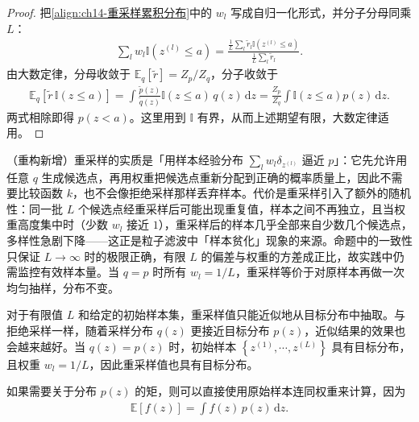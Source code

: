 \documentclass[../../main.tex]{subfiles}
\begin{document}
\begin{proof}
把\eqref{align:ch14-重采样累积分布}中的 $w_{l}$ 写成自归一化形式，并分子分母同乘 $L$：
\begin{align*}
\sum_{l}w_{l}\mathbb{I}\!\left(z^{(l)}\leqslant a\right)=\frac{\frac{1}{L}\sum_{l}\tilde{r}_{l}\mathbb{I}\!\left(z^{(l)}\leqslant a\right)}{\frac{1}{L}\sum_{l}\tilde{r}_{l}}.
\end{align*}
由大数定律，分母收敛于 $\mathbb{E}_{q}\left[\tilde{r}\right]=Z_{p}/Z_{q}$，分子收敛于
\begin{align*}
\mathbb{E}_{q}\left[\tilde{r}\,\mathbb{I}(z\leqslant a)\right]=\int\frac{\widetilde{p}(z)}{\widetilde{q}(z)}\mathbb{I}(z\leqslant a)\,q(z)\,\mathrm{d}z=\frac{Z_{p}}{Z_{q}}\int\mathbb{I}(z\leqslant a)p(z)\,\mathrm{d}z.
\end{align*}
两式相除即得 $p(z<a)$。这里用到 $\mathbb{I}$ 有界，从而上述期望有限，大数定律适用。
\end{proof}

\begin{remark}（重构新增）重采样的实质是「用样本经验分布 $\sum_{l}w_{l}\delta_{z^{(l)}}$ 逼近 $p$」：它先允许用任意 $q$ 生成候选点，再用权重把候选点重新分配到正确的概率质量上，因此不需要比较函数 $k$，也不会像拒绝采样那样丢弃样本。代价是重采样引入了额外的随机性：同一批 $L$ 个候选点经重采样后可能出现重复值，样本之间不再独立，且当权重高度集中时（少数 $w_{l}$ 接近 $1$），重采样后的样本几乎全部来自少数几个候选点，多样性急剧下降——这正是粒子滤波中「样本贫化」现象的来源。命题中的一致性只保证 $L\to\infty$ 时的极限正确，有限 $L$ 的偏差与权重的方差成正比，故实践中仍需监控有效样本量。当 $q=p$ 时所有 $w_{l}=1/L$，重采样等价于对原样本再做一次均匀抽样，分布不变。
\end{remark}

对于有限值 $L$ 和给定的初始样本集，重采样值只能近似地从目标分布中抽取。与拒绝采样一样，随着采样分布 $q(z)$ 更接近目标分布 $p(z)$，近似结果的效果也会越来越好。当 $q(z)=p(z)$ 时，初始样本 $\left\{z^{(1)},\cdots,z^{(L)}\right\}$ 具有目标分布，且权重 $w_{l}=1/L$，因此重采样值也具有目标分布。

如果需要关于分布 $p(z)$ 的矩，则可以直接使用原始样本连同权重来计算，因为
\begin{align}
\mathbb{E}[f(z)]=\int f(z)\,p(z)\,\mathrm{d}z.
\label{align:ch14-重采样矩}
\end{align}
\end{document}
